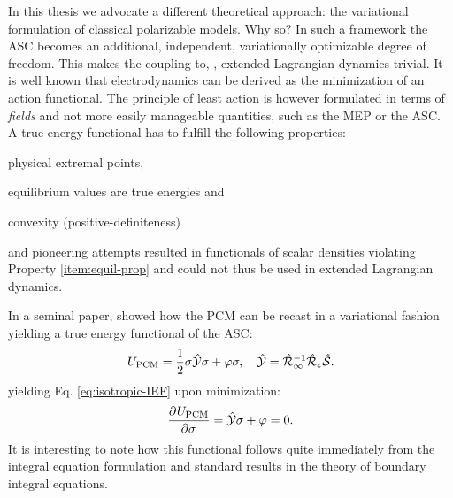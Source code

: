 In this thesis we advocate a different theoretical approach: the
variational formulation of classical polarizable models.
Why so? In such a framework the \acrshort{ASC} becomes an additional,
independent, variationally optimizable degree of freedom.
This makes the coupling to, \eg, extended Lagrangian dynamics
trivial.\autocite{Car1985-jw}
It is well known that electrodynamics can be derived as the minimization
of an action functional.\autocite{Jackson1999}
The principle of least action is however formulated in terms of
\emph{fields} and not more easily manageable quantities, such as the
\acrshort{MEP} or the \acrshort{ASC}.
A true energy functional has to fulfill the following
properties:\autocite{Solis2013-ef}
\begin{enumerate*}[label={\alph*)},font={\color{PMS1797}}]
    \item physical extremal points,
    \item equilibrium values are true energies \label{item:equil-prop} and
    \item convexity (positive-definiteness)
\end{enumerate*}
\citeauthor{Allen2001-fp} and \citeauthor{Attard2003-vr} pioneering
attempts resulted in functionals of scalar densities violating
Property \ref{item:equil-prop} and could not thus be used in extended Lagrangian
dynamics.\autocite{Allen2001-fp, Attard2003-vr, Attard2007-lk}

In a seminal paper, \citeauthor{Lipparini2010-be} showed how the
\acrshort{PCM} can be recast in a variational fashion yielding a true energy
functional of the \acrshort{ASC}:\autocite{Lipparini2010-be, Lipparini2011-aj, Lipparini2016-mo}
\begin{equation}\label{eq:pcm-functional}
 U_\mathrm{PCM} = \frac{1}{2}\sigma\hat{\mathcal{Y}}\sigma + \varphi\sigma,
 \quad
  \hat{\mathcal{Y}} = \hat{\mathcal{R}}_\infty^{-1}\hat{\mathcal{R}}_\varepsilon\hat{\mathcal{S}}.
\end{equation}
yielding Eq. \eqref{eq:isotropic-IEF} upon minimization:
\begin{equation}\label{eq:pcm-stationarity}
  \frac{\partial^{}U_\mathrm{PCM}} {\partial \sigma^{}} = \hat{\mathcal{Y}}\sigma + \varphi = 0.
\end{equation}
It is interesting to note how this functional follows quite immediately
from the integral equation formulation and standard results in the
theory of boundary integral equations.\autocite{Hsiao2008-xb}

